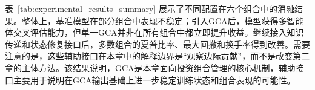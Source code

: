 



表~\ref{tab:experimental_results_summary} 展示了不同配置在六个组合中的消融结果。整体上，基准模型在部分组合中表现不稳定；引入GCA后，模型获得多智能体交叉评估能力，但单一GCA并非在所有组合中都立即提升收益。继续接入知识传递和状态修复接口后，多数组合的夏普比率、最大回撤和换手率得到改善。需要注意的是，这些辅助接口在本章中的解释边界是“观察边际贡献”，而不是改变第二章的主体方法。该结果说明，GCA是本章面向投资组合管理的核心机制，辅助接口主要用于说明在GCA输出基础上进一步稳定训练状态和组合表现的可能性。



